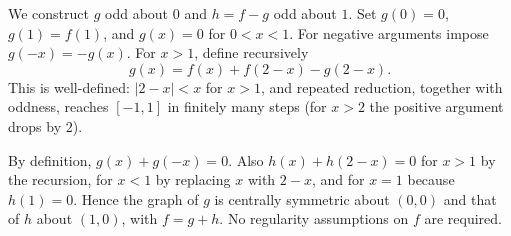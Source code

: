 We construct $g$ odd about $0$ and $h=f-g$ odd about $1$. Set $g(0)=0$, $g(1)=f(1)$, and $g(x)=0$ for $0<x<1$. For negative arguments impose $g(-x)=-g(x)$. For $x>1$, define recursively
\[
g(x)=f(x)+f(2-x)-g(2-x).
\]
This is well-defined: $|2-x|<x$ for $x>1$, and repeated reduction, together with oddness, reaches $[-1,1]$ in finitely many steps (for $x>2$ the positive argument drops by $2$).

By definition, $g(x)+g(-x)=0$. Also $h(x)+h(2-x)=0$ for $x>1$ by the recursion, for $x<1$ by replacing $x$ with $2-x$, and for $x=1$ because $h(1)=0$. Hence the graph of $g$ is centrally symmetric about $(0,0)$ and that of $h$ about $(1,0)$, with $f=g+h$. No regularity assumptions on $f$ are required.
